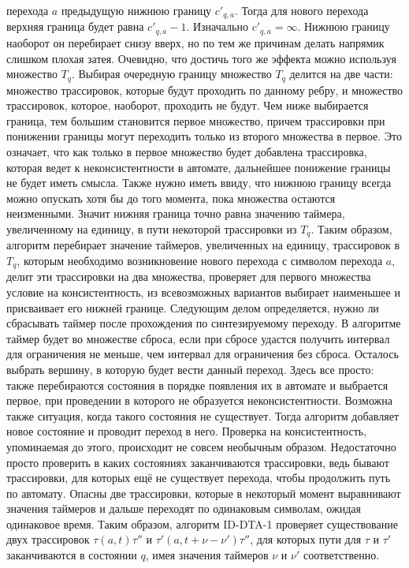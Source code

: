 \documentclass[times,specification,annotation]{itmo-student-thesis}
\begin{document}
перехода $a$ предыдущую нижнюю границу $c'_{q, a}$. Тогда для нового перехода верхняя граница будет равна $c'_{q, a} - 1$. Изначально $c'_{q, a} = \infty$. Нижнюю границу наоборот он
перебирает снизу вверх, но по тем же причинам делать напрямик слишком плохая затея. Очевидно, что достичь того же эффекта можно используя множество $T_q$. Выбирая очередную границу множество $T_q$ делится
на две части: множество трассировок, которые будут проходить по данному ребру, и множество трассировок, которое, наоборот, проходить не будут. Чем ниже выбирается граница, тем большим становится
первое множество, причем трассировки при понижении границы могут переходить только из второго множества в первое. Это означает, что как только в первое множество будет добавлена трассировка,
которая ведет к неконсистентности в автомате, дальнейшее понижение границы не будет иметь смысла. Также нужно иметь ввиду, что нижнюю границу всегда можно опускать хотя бы до того момента, 
пока множества остаются неизменными. Значит нижняя граница точно равна значению таймера, увеличенному на единицу, в пути некоторой трассировки из $T_q$. Таким образом, алгоритм перебирает 
значение таймеров, увеличенных на единицу, трассировок в $T_q$, которым необходимо возникновение нового перехода с символом перехода $a$, делит эти трассировки на два множества, 
проверяет для первого множества условие на консистентность, из всевозможных вариантов выбирает наименьшее и присваивает его нижней границе. Следующим делом определяется, нужно ли 
сбрасывать таймер после прохождения по синтезируемому переходу. В алгоритме таймер будет во множестве сброса, если при сбросе удастся получить интервал для ограничения не меньше, чем
интервал для ограничения без сброса. Осталось выбрать вершину, в которую будет вести данный переход. Здесь все просто: также перебираются состояния в порядке появления их в автомате и
выбрается первое, при проведении в которого не образуется неконсистентности. Возможна также ситуация, когда такого состояния не существует. Тогда алгоритм добавляет новое состояние и проводит 
переход в него. Проверка на консистентность, упоминаемая до этого, происходит не совсем необычным образом. Недостаточно просто проверить в каких состояниях заканчиваются трассировки, ведь бывают
трассировки, для которых ещё не существует перехода, чтобы продолжить путь по автомату. Опасны две трассировки, которые в некоторый момент выравнивают значения таймеров и дальше переходят
по одинаковым символам, ожидая одинаковое время. Таким образом, алгоритм ID-DTA-1 проверяет существование двух трассировок $\tau(a, t)\tau''$ и $\tau'(a, t + \nu - \nu')\tau''$, для
которых пути для $\tau$ и $\tau'$ заканчиваются в состоянии $q$, имея значения таймеров $\nu$ и $\nu'$ соответственно. 
\end{document}
